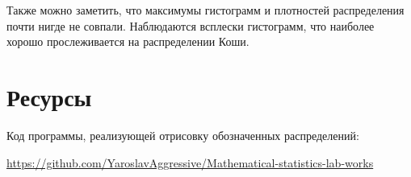 \documentclass[a4paper]{article}
\begin{document}
Также можно заметить, что максимумы гистограмм и плотностей распределения почти нигде не совпали. Наблюдаются всплески гистограмм,
что наиболее хорошо прослеживается на распределении Коши.
\section{Ресурсы}
    \begin{spacing}{2.5}
        Код программы, реализующей отрисовку обозначенных распределений:
        
        \href{https://github.com/YaroslavAggressive/Mathematical-statistics-lab-works}{https://github.com/YaroslavAggressive/Mathematical-statistics-lab-works}
    \end{spacing}
\end{document}
